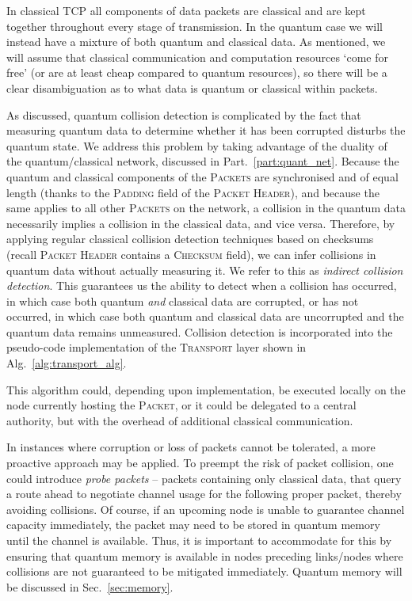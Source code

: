 In classical TCP all components of data packets are classical and are kept together throughout every stage of transmission. In the quantum case we will instead have a mixture of both quantum and classical data. As mentioned, we will assume that classical communication and computation resources `come for free' (or are at least cheap compared to quantum resources), so there will be a clear disambiguation as to what data is quantum or classical within packets.

As discussed, quantum collision detection is complicated by the fact that measuring quantum data to determine whether it has been corrupted disturbs the quantum state. We address this problem by taking advantage of the duality of the quantum/classical network, discussed in Part.~\ref{part:quant_net}. Because the quantum and classical components of the \textsc{Packets} are synchronised and of equal length (thanks to the \textsc{Padding} field of the \textsc{Packet Header}), and because the same applies to all other \textsc{Packets} on the network, a collision in the quantum data necessarily implies a collision in the classical data, and vice versa. Therefore, by applying regular classical collision detection techniques based on checksums (recall \textsc{Packet Header} contains a \textsc{Checksum} field), we can infer collisions in quantum data without actually measuring it. We refer to this as \textit{indirect collision detection}. This guarantees us the ability to detect when a collision has occurred, in which case both quantum \textit{and} classical data are corrupted, or has not occurred, in which case both quantum and classical data are uncorrupted and the quantum data remains unmeasured. Collision detection is incorporated into the pseudo-code implementation of the \textsc{Transport} layer shown in Alg.~\ref{alg:transport_alg}.

This algorithm could, depending upon implementation, be executed locally on the node currently hosting the \textsc{Packet}, or it could be delegated to a central authority, but with the overhead of additional classical communication.

In instances where corruption or loss of packets cannot be tolerated, a more proactive approach may be applied. To preempt the risk of packet collision, one could introduce \textit{probe packets} -- packets containing only classical data, that query a route ahead to negotiate channel usage for the following proper packet, thereby avoiding collisions. Of course, if an upcoming node is unable to guarantee channel capacity immediately, the packet may need to be stored in quantum memory until the channel is available. Thus, it is important to accommodate for this by ensuring that quantum memory is available in nodes preceding links/nodes where collisions are not guaranteed to be mitigated immediately. Quantum memory will be discussed in Sec.~\ref{sec:memory}.